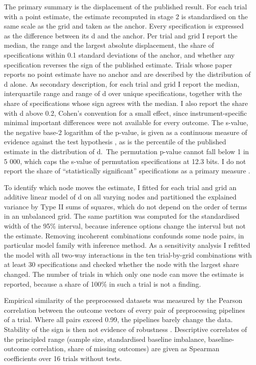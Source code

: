 The primary summary is the displacement of the published result. For each trial with a point estimate, the estimate recomputed in stage 2 is standardised on the same scale as the grid and taken as the anchor. Every specification is expressed as the difference between its d and the anchor. Per trial and grid I report the median, the range and the largest absolute displacement, the share of specifications within 0.1 standard deviations of the anchor, and whether any specification reverses the sign of the published estimate. Trials whose paper reports no point estimate have no anchor and are described by the distribution of d alone. As secondary description, for each trial and grid I report the median, interquartile range and range of d over unique specifications, together with the share of specifications whose sign agrees with the median. I also report the share with \textbar d\textbar{} above 0.2, Cohen's convention for a small effect, since instrument-specific minimal important differences were not available for every outcome. The s-value, the negative base-2 logarithm of the p-value, is given as a continuous measure of evidence against the test hypothesis \cite{Rafi_2020}, as is the percentile of the published estimate in the distribution of d.~The permutation p-value cannot fall below 1 in 5 000, which caps the s-value of permutation specifications at 12.3 bits. I do not report the share of ``statistically significant'' specifications as a primary measure \cite{Wasserstein_2019}.

To identify which node moves the estimate, I fitted for each trial and grid an additive linear model of d on all varying nodes and partitioned the explained variance by Type II sums of squares, which do not depend on the order of terms in an unbalanced grid. The same partition was computed for the standardised width of the 95\% interval, because inference options change the interval but not the estimate. Removing incoherent combinations confounds some node pairs, in particular model family with inference method. As a sensitivity analysis I refitted the model with all two-way interactions in the ten trial-by-grid combinations with at least 30 specifications and checked whether the node with the largest share changed. The number of trials in which only one node can move the estimate is reported, because a share of 100\% in such a trial is not a finding.

Empirical similarity of the preprocessed datasets was measured by the Pearson correlation between the outcome vectors of every pair of preprocessing pipelines of a trial. Where all pairs exceed 0.99, the pipelines barely change the data. Stability of the sign is then not evidence of robustness \cite{Short_2026}. Descriptive correlates of the principled range (sample size, standardised baseline imbalance, baseline-outcome correlation, share of missing outcomes) are given as Spearman coefficients over 16 trials without tests.

